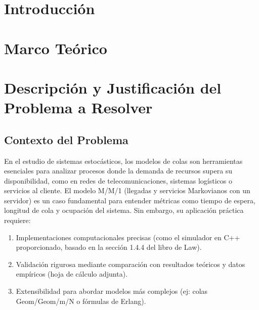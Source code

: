 \documentclass{article}
\begin{document}
\tableofcontents %

\newpage %



\section{Introducción}\label{sec:intr}



\section{Marco Teórico}\label{sec:marc}



\section{Descripción y Justificación del Problema a Resolver}\label{sec:descr}

\subsection{Contexto del Problema}
En el estudio de sistemas estocásticos, los modelos de colas son herramientas esenciales para analizar procesos donde la demanda de recursos supera su disponibilidad, como en redes de telecomunicaciones, sistemas logísticos o servicios al cliente. El modelo M/M/1 (llegadas y servicios Markovianos con un servidor) es un caso fundamental para entender métricas como tiempo de espera, longitud de cola y ocupación del sistema. Sin embargo, su aplicación práctica requiere:
\begin{enumerate}
    \item Implementaciones computacionales precisas (como el simulador en C++ proporcionado, basado en la sección 1.4.4 del libro de Law).
    \item Validación rigurosa mediante comparación con resultados teóricos y datos empíricos (hoja de cálculo adjunta).
    \item Extensibilidad para abordar modelos más complejos (ej: colas Geom/Geom/m/N o fórmulas de Erlang).
\end{enumerate}
\end{document}
